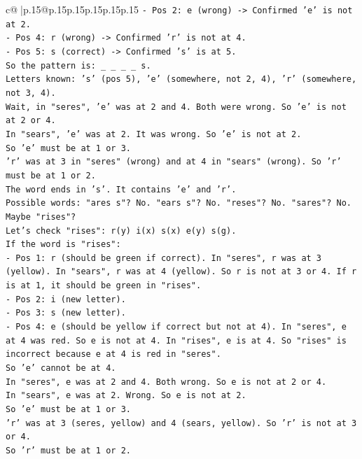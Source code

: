 \documentclass{article}
\begin{document}
{\begin{supertabular}{c@{$\;$}|p{.15\linewidth}@{}p{.15\linewidth}p{.15\linewidth}p{.15\linewidth}p{.15\linewidth}p{.15\linewidth}}
{{{\texttt{{-} Pos 2: e (wrong) {-}> Confirmed 'e' is not at 2.} \\
\texttt{{-} Pos 4: r (wrong) {-}> Confirmed 'r' is not at 4.} \\
\texttt{{-} Pos 5: s (correct) {-}> Confirmed 's' is at 5.} \\
\texttt{So the pattern is: \_ \_ \_ \_ s.} \\
\texttt{Letters known: 's' (pos 5), 'e' (somewhere, not 2, 4), 'r' (somewhere, not 3, 4).} \\
\texttt{Wait, in "seres", 'e' was at 2 and 4. Both were wrong. So 'e' is not at 2 or 4.} \\
\texttt{In "sears", 'e' was at 2. It was wrong. So 'e' is not at 2.} \\
\texttt{So 'e' must be at 1 or 3.} \\
\texttt{'r' was at 3 in "seres" (wrong) and at 4 in "sears" (wrong). So 'r' must be at 1 or 2.} \\
\texttt{The word ends in 's'. It contains 'e' and 'r'.} \\
\texttt{Possible words: "ares s"? No. "ears s"? No. "reses"? No. "sares"? No.} \\
\texttt{Maybe "rises"?} \\
\texttt{Let's check "rises": r(y) i(x) s(x) e(y) s(g).} \\
\texttt{If the word is "rises":} \\
\texttt{{-} Pos 1: r (should be green if correct). In "seres", r was at 3 (yellow). In "sears", r was at 4 (yellow). So r is not at 3 or 4. If r is at 1, it should be green in "rises".} \\
\texttt{{-} Pos 2: i (new letter).} \\
\texttt{{-} Pos 3: s (new letter).} \\
\texttt{{-} Pos 4: e (should be yellow if correct but not at 4). In "seres", e at 4 was red. So e is not at 4. In "rises", e is at 4. So "rises" is incorrect because e at 4 is red in "seres".} \\
\texttt{So 'e' cannot be at 4.} \\
\texttt{In "seres", e was at 2 and 4. Both wrong. So e is not at 2 or 4.} \\
\texttt{In "sears", e was at 2. Wrong. So e is not at 2.} \\
\texttt{So 'e' must be at 1 or 3.} \\
\texttt{'r' was at 3 (seres, yellow) and 4 (sears, yellow). So 'r' is not at 3 or 4.} \\
\texttt{So 'r' must be at 1 or 2.} \\
}}}
\end{supertabular}}
\end{document}

